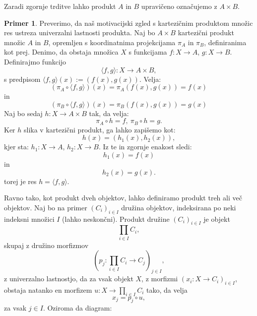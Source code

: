 \documentclass[12pt,a4paper]{book}
\theoremstyle{definition}
\theoremstyle{plain}
\theoremstyle{definition}
\newtheorem{primer}{Primer}[section]
\theoremstyle{remark}
\begin{document}
Zaradi zgornje trditve lahko produkt $A$ in $B$ upravičeno označujemo z $A \times B$.
%
\begin{primer}
Preverimo, da naš motivacijski zgled s kartezičnim produktom množic res ustreza univerzalni lastnosti produkta. Naj bo $A \times B$ kartezični produkt množic $A$ in $B$, opremljen s koordinatnima projekcijama $\pi_A$ in $\pi_B$, definiranima kot prej. Denimo, da obstaja množica $X$ s funkcijama $f : X \to A$, $g : X \to B$. Definirajmo funkcijo 
$$\langle f,g \rangle : X \to A \times B,$$
s predpisom $\langle f,g \rangle(x) := (f(x),g(x))$. Velja:
$$ (\pi_A \circ \langle f,g \rangle)(x) = \pi_A(f(x),g(x)) = f(x) $$
in 
$$ (\pi_B \circ \langle f,g \rangle)(x) = \pi_B(f(x),g(x)) = g(x) $$
Naj bo sedaj $h : X \to A \times B$ tak, da velja:
$$\pi_A \circ h = f, \ \pi_B \circ h = g.$$
Ker $h$ slika v kartezični produkt, ga lahko zapišemo kot:
$$h(x) = (h_1(x),h_2(x)),$$
kjer sta: $h_1 : X \to A$, $h_2 : X \to B$.
Iz te in zgornje enakost sledi:
$$h_1(x) = f(x)$$
in $$h_2(x) = g(x).$$
torej je res $h = \langle f,g \rangle$.
\end{primer}
%
Ravno tako, kot produkt dveh objektov, lahko definiramo produkt treh ali več objektov. Naj bo na primer $(C_i)_{i \in I}$ družina objektov, indeksirana po neki indeksni množici $I$ (lahko neskončni). Produkt družine $(C_i)_{i \in I}$ je objekt
$$\prod_{i \in I}C_i,$$
skupaj z družino morfizmov 
$$(p_j : \prod_{i \in I}C_i \to C_j)_{j \in I},$$
z univerzalno lastnostjo, da za vsak objekt $X$, z morfizmi $(x_i : X \to C_i)_{i \in I}$, obstaja natanko en morfizem $u : X \to \prod_{i \in I}C_i$ tako, da velja
$$x_j = p_j \circ u,$$
za vsak $j \in I$. Oziroma da diagram:
\end{document}
